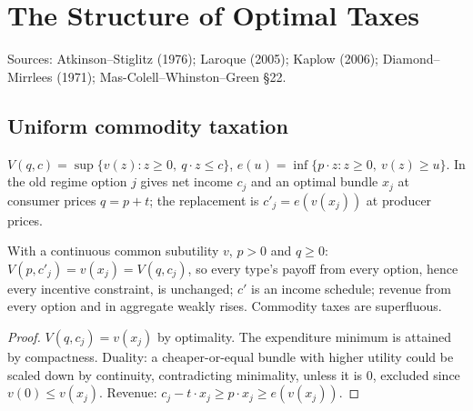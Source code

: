 \chapter{The Structure of Optimal Taxes}
\label{chap:tax_structure}

Sources: Atkinson--Stiglitz (1976); Laroque (2005); Kaplow (2006); Diamond--Mirrlees (1971); Mas-Colell--Whinston--Green
\S22.

\section{Uniform commodity taxation}

\begin{definition}
\label{def:as}
\leanok
$V(q,c)=\sup\{v(z):z\ge0,\ q\cdot z\le c\}$, $e(u)=\inf\{p\cdot z:z\ge0,\ v(z)\ge u\}$. In the old regime option $j$ gives net
income $c_j$ and an optimal bundle $x_j$ at consumer prices $q=p+t$; the replacement is $c'_j=e(v(x_j))$ at producer prices.
\end{definition}

\begin{theorem}
\label{thm:as}
\leanok
{}
With a continuous common subutility $v$, $p>0$ and $q\ge0$: $V(p,c'_j)=v(x_j)=V(q,c_j)$, so every type's payoff from every
option, hence every incentive constraint, is unchanged; $c'$ is an income schedule; revenue from every option and in aggregate
weakly rises. Commodity taxes are superfluous.
\end{theorem}
\begin{proof}
\leanok
$V(q,c_j)=v(x_j)$ by optimality. The expenditure minimum is attained by compactness. Duality: a cheaper-or-equal bundle with
higher utility could be scaled down by continuity, contradicting minimality, unless it is $0$, excluded since $v(0)\le v(x_j)$.
Revenue: $c_j-t\cdot x_j\ge p\cdot x_j\ge e(v(x_j))$.
\end{proof}


